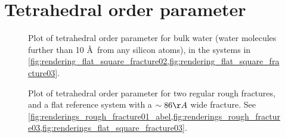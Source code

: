 \section{Tetrahedral order parameter}
%
%
\begin{figure}[htpb]%
    \centering%
    \caption{%
        Plot of tetrahedral order parameter for bulk water (water molecules further than 10 \AA\ from any silicon atoms), in the systems in \cref{fig:rendering_flat_square_fracture02,fig:rendering_flat_square_fracture03}.%
    }%
\end{figure}%
%
\begin{figure}[!p]%
    \centering%
    {
        \captionsetup{width=\textwidth} 
        \caption{%
            Plot of tetrahedral order parameter for two regular rough fractures, and a flat reference system with a $\sim 86 \AA$ wide fracture. See \cref{fig:renderings_rough_fracture01_abel,fig:renderings_rough_fracture03,fig:renderings_flat_square_fracture03}.%
        }%
    }
\end{figure}%
%
